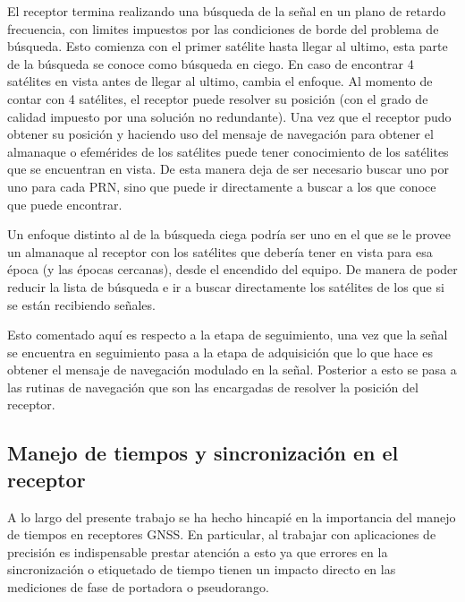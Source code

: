 \documentclass[a4paper,12pt,oneside,onecolumn,final,openright]{book}%
\begin{document}
	El receptor termina realizando una búsqueda de la señal en un plano de retardo frecuencia, con limites impuestos por las condiciones de borde del problema de búsqueda. Esto comienza con el primer satélite hasta llegar al ultimo, esta parte de la búsqueda se conoce como búsqueda en ciego. En caso de encontrar 4 satélites en vista antes de llegar al ultimo, cambia el enfoque. Al momento de contar con 4 satélites, el receptor puede resolver su posición (con el grado de calidad impuesto por una solución no redundante). Una vez que el receptor pudo obtener su posición y haciendo uso del mensaje de navegación para obtener el almanaque o efemérides de los satélites puede tener conocimiento de los satélites que se encuentran en vista. De esta manera deja de ser necesario buscar uno por uno para cada PRN, sino que puede ir directamente a buscar a los que conoce que puede encontrar.
	
	Un enfoque distinto al de la búsqueda ciega podría ser uno en el que se le provee un almanaque al receptor con los satélites que debería tener en vista para esa época (y las épocas cercanas), desde el encendido del equipo. De manera de poder reducir la lista de búsqueda e ir a buscar directamente los satélites de los que si se están recibiendo señales.
	
	Esto comentado aquí es respecto a la etapa de seguimiento, una vez que la señal se encuentra en seguimiento pasa a la etapa de adquisición que lo que hace es obtener el mensaje de navegación modulado en la señal. Posterior a esto se pasa a las rutinas de navegación que son las encargadas de resolver la posición del receptor.
\subsection{Manejo de tiempos y sincronización en el receptor}\label{sec:times}
	A lo largo del presente trabajo se ha hecho hincapié en la importancia del manejo de tiempos en receptores GNSS. En particular, al trabajar con aplicaciones de precisión es indispensable prestar atención a esto ya que errores en la sincronización o etiquetado de tiempo tienen un impacto directo en las mediciones de fase de portadora o pseudorango. 
	
\end{document}
